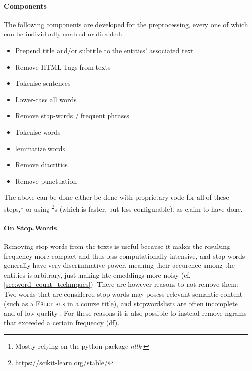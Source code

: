 \paragraph{Components} The following components are developed for the preprocessing, every one of which can be individually enabled or disabled:

\begin{itemize}
	\item Prepend title and/or subtitle to the entities' associated text 
	\item Remove HTML-Tags from texts 
	\item Tokenise sentences 
	\item Lower-case all words
	\item Remove stop-words / frequent phrases
	\item Tokenise words
	\item \Gls{lemma}tize words
	\item Remove diacritics
	\item Remove punctuation 
\end{itemize}

The above can be done either be done with proprietary code for all of these steps,\footnote{Mostly relying on the python package \emph{nltk} \cite{bird2009natural}} or using \footnote{\url{https://scikit-learn.org/stable/}}s  (which is faster, but less configurable), as \cite{Ager2018} claim to have done.

\paragraph{On Stop-Words}
Removing stop-words from the texts is useful because it makes the resulting frequency more compact and thus less computationally intensive, and stop-words generally have very discriminative power, meaning their occurence among the entities is arbitrary, just making hte emeddings more noisy (cf. \autoref{sec:word_count_techniques}). There are however reasons to not remove them: Two words that are considered stop-words may posess relevant semantic content (such as a \textsc{Fällt aus} in a course title), and stopwordslists are often incomplete and of low quality \cite{nothman-etal-2018-stop}. For these reasons it is also possible to instead remove \glspl{ngram} that exceeded a certain frequency (\gls{df}).

